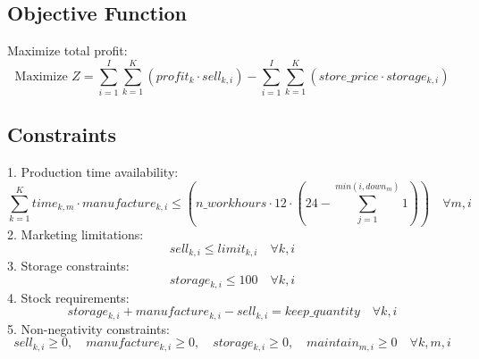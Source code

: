 \documentclass{article}
\begin{document}
\subsection*{Objective Function}
Maximize total profit:
\[
\text{Maximize } Z = \sum_{i=1}^{I} \sum_{k=1}^{K} (profit_{k} \cdot sell_{k,i}) - \sum_{i=1}^{I} \sum_{k=1}^{K} (store\_price \cdot storage_{k,i})
\]

\subsection*{Constraints}
1. Production time availability:
\[
\sum_{k=1}^{K} time_{k,m} \cdot manufacture_{k,i} \leq (n\_workhours \cdot 12 \cdot \left(24 - \sum_{j=1}^{min(i, down_{m})} 1\right)) \quad \forall m, i
\]
2. Marketing limitations:
\[
sell_{k,i} \leq limit_{k,i} \quad \forall k, i
\]
3. Storage constraints:
\[
storage_{k,i} \leq 100 \quad \forall k, i
\]
4. Stock requirements:
\[
storage_{k,i} + manufacture_{k,i} - sell_{k,i} = keep\_quantity \quad \forall k, i
\]
5. Non-negativity constraints:
\[
sell_{k,i} \geq 0, \quad manufacture_{k,i} \geq 0, \quad storage_{k,i} \geq 0, \quad maintain_{m,i} \geq 0 \quad \forall k, m, i
\]
\end{document}
